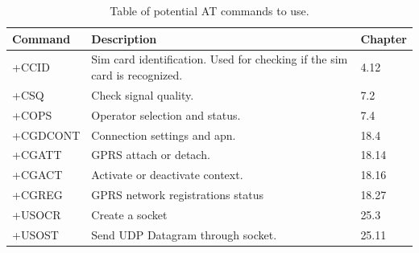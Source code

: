 \begin{table}[H]
	\begin{tabularx}{\textwidth}{l X X}
		\toprule
		Command & Description & Chapter \\
		\midrule
		+CCID & Sim card identification. Used for checking if the sim card is recognized. & 4.12 \\
		+CSQ & Check signal quality. & 7.2 \\
		+COPS & Operator selection and status. & 7.4 \\
		+CGDCONT & Connection settings and apn. & 18.4 \\
		+CGATT & GPRS attach or detach. & 18.14 \\
		+CGACT & Activate or deactivate context. & 18.16 \\
		+CGREG & GPRS network registrations status & 18.27 \\
		+USOCR & Create a socket				& 25.3 \\
		+USOST & Send UDP Datagram through socket. & 25.11 \\
		\bottomrule
	\end{tabularx}
	\caption{Table of potential AT commands to use.}
	\label{tab:ATcomm}
\end{table}

\FloatBarrier
